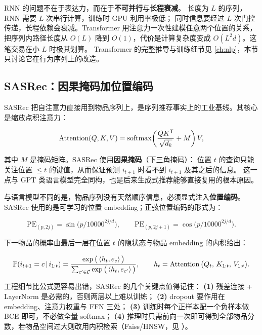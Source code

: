 RNN 的问题不在于表达力，而在于\textbf{不可并行}与\textbf{长程衰减}。
长度为 $L$ 的序列，RNN 需要 $L$ 次串行计算，训练时 GPU 利用率极低；
同时信息要经过 $L$ 次门控传递，长程依赖会衰减。Transformer \cite{vaswani2017attention} 用注意力一次性建模任意两个位置的关系，
把序列内路径长度从 $O(L)$ 降到 $O(1)$，代价是计算复杂度变成 $O(L^2 d)$。这笔交易在小 $L$ 时极其划算。
Transformer 的完整推导与训练细节见 \cref{ch:nlp}，本节只讨论它在行为序列上的改造。

\subsection{SASRec：因果掩码加位置编码}

SASRec \cite{kang2018sasrec} 把自注意力直接用到物品序列上，是序列推荐事实上的工业基线。其核心是缩放点积注意力：

\begin{equation}
\operatorname{Attention}(Q, K, V) = \operatorname{softmax}\!\left( \frac{Q K^{\mathsf{T}}}{\sqrt{d_k}} + M \right) V ,
\label{eq:self-attn}
\end{equation}

其中 $M$ 是掩码矩阵。SASRec 使用\textbf{因果掩码}（下三角掩码）：
位置 $t$ 的查询只能关注位置 $\le t$ 的键值，从而保证预测 $i_{t+1}$ 时看不到 $i_{t+1}$ 及其之后的信息。
这一点与 GPT 类语言模型完全同构，也是后来生成式推荐能够直接复用的根本原因。

与语言模型不同的是，物品序列没有天然顺序信息，必须显式注入\textbf{位置编码}。
SASRec 使用的是可学习的位置 embedding；正弦位置编码的形式为：

\begin{equation}
\text{PE}_{(p, 2j)} = \sin\!\big( p / 10000^{2j/d} \big), \qquad
\text{PE}_{(p, 2j+1)} = \cos\!\big( p / 10000^{2j/d} \big) .
\label{eq:pe}
\end{equation}

下一物品的概率由最后一层在位置 $t$ 的隐状态与物品 embedding 的内积给出：

\begin{equation}
\operatorname{\mathbb{P}}(i_{t+1} = c \,\vert\, i_{1:t})
= \frac{ \exp\big( \left\langle  h_t ,  e_c  \right\rangle \big) }
       { \sum_{c' \in \mathcal{C}} \exp\big( \left\langle  h_t ,  e_{c'}  \right\rangle \big) },
\qquad
h_t = \operatorname{Attention}\big( Q_t,\, K_{1:t},\, V_{1:t} \big) .
\label{eq:sasrec-prob}
\end{equation}

工程细节比公式更容易出错，SASRec 的几个关键点值得记住：
\textbf{(1)} 残差连接 + LayerNorm 是必需的，否则两层以上难以训练；
\textbf{(2)} dropout 要作用在 embedding、注意力权重与 FFN 三处；
\textbf{(3)} 训练时每个正样本配一个负样本做 BCE 即可，不必做全量 softmax；
\textbf{(4)} 推理时只需前向一次即可得到全部物品分数，若物品空间过大则改用内积检索（Faiss/HNSW，见 \cite{johnson2019faiss,malkov2020hnsw}）。


